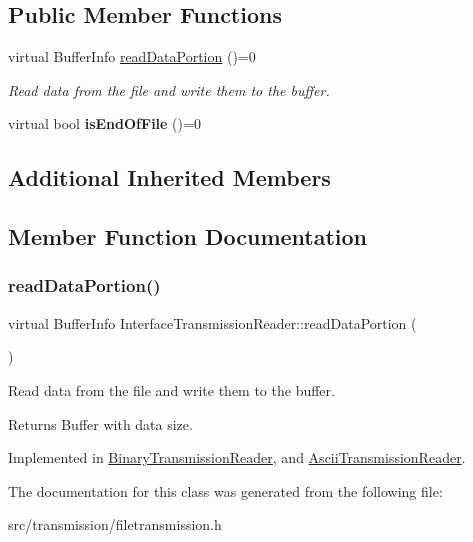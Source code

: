 \subsection*{Public Member Functions}
\begin{DoxyCompactItemize}
\item 
virtual Buffer\+Info \hyperlink{classInterfaceTransmissionReader_ab8733fbc3a4f6dc8279c363212fd3f51}{read\+Data\+Portion} ()=0
\begin{DoxyCompactList}\small\item\em Read data from the file and write them to the buffer. \end{DoxyCompactList}\item 
\mbox{\label{classInterfaceTransmissionReader_ad14bc1782e5d39da2f982e726cb4f51c}} 
virtual bool {\bfseries is\+End\+Of\+File} ()=0
\end{DoxyCompactItemize}
\subsection*{Additional Inherited Members}


\subsection{Member Function Documentation}
\mbox{\label{classInterfaceTransmissionReader_ab8733fbc3a4f6dc8279c363212fd3f51}} 
\subsubsection{\texorpdfstring{read\+Data\+Portion()}{readDataPortion()}}
{\footnotesize\ttfamily virtual Buffer\+Info Interface\+Transmission\+Reader\+::read\+Data\+Portion (\begin{DoxyParamCaption}{ }\end{DoxyParamCaption})\hspace{0.3cm}{\ttfamily [pure virtual]}}



Read data from the file and write them to the buffer. 

\begin{DoxyReturn}{Returns}
Buffer with data size. 
\end{DoxyReturn}


Implemented in \hyperlink{classBinaryTransmissionReader_a003a0b7a500a15ddfc573e6f54006b0c}{Binary\+Transmission\+Reader}, and \hyperlink{classAsciiTransmissionReader_a5fd477415e273e4943caac08e8b0a7e5}{Ascii\+Transmission\+Reader}.



The documentation for this class was generated from the following file\+:\begin{DoxyCompactItemize}
\item 
src/transmission/filetransmission.\+h\end{DoxyCompactItemize}
